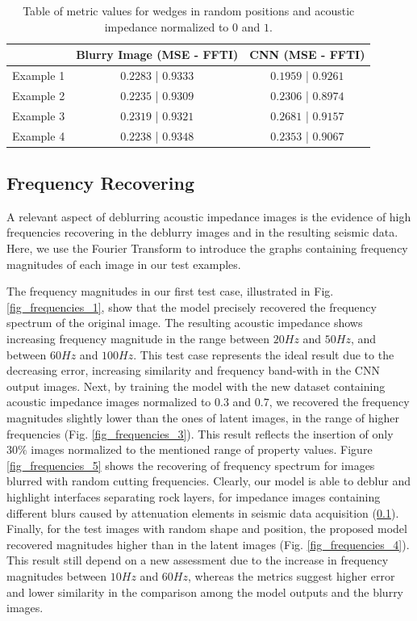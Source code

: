 \documentclass[conference]{IEEEtran}
\begin{document}
\begin{table}[!t]
\renewcommand{\arraystretch}{1.2}
\caption{Table of metric values for wedges in random positions and acoustic impedance normalized to $0$ and $1$.}
\label{table_caso_6}
\centering
\begin{tabular}{|c||c||c|}
\hline
  & Blurry Image (MSE - FFTI) & CNN (MSE - FFTI)\\
\hline
Example 1 & $0.2283$ | $0.9333$ & $0.1959$ | $0.9261$\\
\hline
Example 2 & $0.2235$ | $0.9309$ & $0.2306$ | $0.8974$\\
\hline
Example 3 & $0.2319$ | $0.9321$ & $0.2681$ | $0.9157$\\
\hline
Example 4 & $0.2238$ | $0.9348$ & $0.2353$ | $0.9067$\\
\hline
\end{tabular}
\end{table}

\subsection{Frequency Recovering}
A relevant aspect of deblurring acoustic impedance images is the
evidence of high frequencies recovering in the deblurry images and in
the resulting seismic data. Here, we use the Fourier Transform
to introduce the graphs containing frequency magnitudes of each image in our
test examples.

The frequency magnitudes in our first test case, illustrated in Fig. \ref{fig_frequencies_1},
show that the model precisely recovered the frequency spectrum of the original image.
The resulting acoustic impedance shows increasing frequency magnitude in the range
between $ 20Hz$ and $ 50Hz $, and between $ 60Hz $ and $ 100Hz $.
This test case represents the ideal result due to the
decreasing error, increasing similarity and frequency band-with in the CNN output images.
Next, by training the model with the new dataset containing acoustic impedance images normalized to $0.3$ and $0.7$,
we recovered the frequency magnitudes slightly lower than the ones of latent images, in the range of higher frequencies
(Fig. \ref{fig_frequencies_3}). This result reflects the insertion of only $30\%$ images normalized to the mentioned range
of property values.
Figure \ref{fig_frequencies_5} shows the recovering of frequency spectrum for images blurred with random cutting
frequencies. Clearly, our model is able to deblur and highlight interfaces separating rock layers, for impedance images containing different blurs caused by attenuation elements in seismic data acquisition (\ref{}).
Finally, for the test images with random shape and position, the proposed model recovered magnitudes higher than in the latent images (Fig. \ref{fig_frequencies_4}). This result still depend on a new assessment due to the increase in frequency magnitudes between $10Hz$ and $60Hz$,  whereas the metrics suggest higher error and lower similarity in the comparison among
the model outputs and the blurry images.
\end{document}
